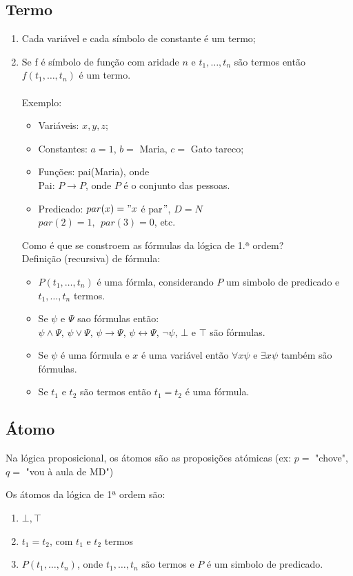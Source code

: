 \documentclass[11pt]{report}
\begin{document}
{    \subsection*{Termo} {
    \begin{enumerate}
        \item Cada variável e cada símbolo de constante é um termo;
        \item { Se f é símbolo de função com aridade $n$ e $t_1, \ldots, t_n$ são termos então $f(t_1, \ldots, t_n)$ é um termo.\\\\
            Exemplo: {
            \begin{itemize}
                \item Variáveis: $x, y, z$;
                \item Constantes: $a = 1$, $b = $ Maria, $c = $ Gato tareco;
                \item Funções: pai(Maria), onde\\ Pai: $P\rightarrow P$, onde $P$ é o conjunto das pessoas.
                \item Predicado: $par(x)="x$ é par\("\), $D=N$\\ $par(2)=1,~~par(3)=0$, etc.
            \end{itemize}
            Como é que se constroem as fórmulas da lógica de 1.ª ordem?\\
            Definição (recursiva) de fórmula:
            \begin{itemize}
                \item $P(t_1, \ldots, t_n)$ é uma fórmla, considerando $P$ um simbolo de predicado e $t_1,\ldots,t_n$ termos.
                \item Se $\psi$ e $\Psi$ sao fórmulas então:\\ $\psi \wedge \Psi$, $\psi \vee \Psi$, $\psi \rightarrow \Psi$, $\psi \leftrightarrow \Psi$, $\neg\psi$, $\bot$ e $\top$ são fórmulas.
                \item Se $\psi$ é uma fórmula e $x$ é uma variável então $\forall x \psi$ e $\exists x \psi$ também são fórmulas.
                \item Se $t_1$ e $t_2$ são termos então $t_1 = t_2$ é uma fórmula.
            \end{itemize}
            }
        }
    \end{enumerate}
    }
    \subsection*{Átomo} {
    Na lógica proposicional, os átomos são as proposições atómicas (ex: $p =$ "chove", $q = $ "vou à aula de MD")\\
    \par Os átomos da lógica de 1ª ordem são:
    \begin{enumerate}
        \item $\bot, \top$
        \item $t_1=t_2$, com $t_1$ e $t_2$ termos
        \item $P(t_1,\ldots,t_n)$, onde $t_1,\ldots,t_n$ são termos e $P$ é um simbolo de predicado.
    \end{enumerate}
}}
\end{document}
